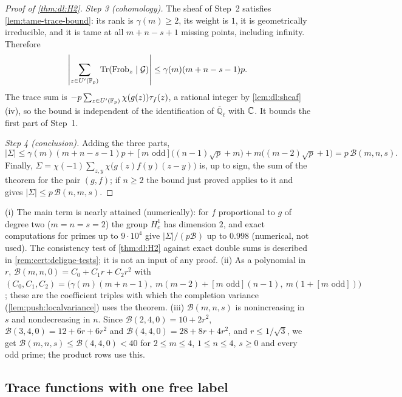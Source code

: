 \begin{proof}[Proof of \cref{thm:dl:H2}]
\emph{Step 3 (cohomology).} The sheaf of Step~2 satisfies
\cref{lem:tame-trace-bound}: its rank is $\gamma(m)\ge2$, its weight is $1$,
it is geometrically irreducible, and it is tame at all
$m+n-s+1$ missing points, including infinity. Therefore
\[
 \left|\sum_{z\in U'(\mathbb F_p)}\mathrm{Tr}(\mathrm{Frob}_z\mid\mathcal G)\right|
 \le\gamma(m)(m+n-s-1)p.
\]
The trace sum is $-p\sum_{z\in U'(\mathbb F_p)}\chi(g(z))\tau_f(z)$, a rational
integer by \cref{lem:dl:sheaf}(iv), so the bound is independent of the
identification of $\overline{\mathbb Q}_\ell$ with $\mathbb C$. It bounds the first
part of Step~1.

\emph{Step 4 (conclusion).} Adding the three parts,
\[
  |\Sigma|\le\gamma(m)(m+n-s-1)p+[m\text{ odd}]\big((n-1)\sqrt p+m\big)
  +m\big((m-2)\sqrt p+1\big)=p\,\mathcal B(m,n,s).
\]
Finally, $\Sigma=\chi(-1)\sum_{z,y}\chi\big(g(z)f(y)(z-y)\big)$ is, up to sign,
the sum of the theorem for the pair $(g,f)$; if $n\ge2$ the bound just proved
applies to it and gives $|\Sigma|\le p\,\mathcal B(n,m,s)$.
\end{proof}

\begin{remark}\label{rem:dl:H2-sharp}
(i) The main term is nearly attained (numerically): for $f$
proportional to $g$ of degree two
($m=n=s=2$) the group $H^1_c$ has dimension $2$, and exact computations for
primes up to $9\cdot10^4$ give $|\Sigma|/(p\mathcal B)$ up to $0.998$
(numerical, not used). The consistency test of \cref{thm:dl:H2} against exact
double sums is described in \cref{rem:cert:deligne-tests}; it is not an input
of any proof.
(ii) As a polynomial in $r$, $\mathcal B(m,n,0)=C_0+C_1r+C_2r^2$ with
$(C_0,C_1,C_2)=\big(\gamma(m)(m+n-1),\ m(m-2)+[m\text{ odd}](n-1),\
m(1+[m\text{ odd}])\big)$; these are the coefficient triples with which the
completion variance (\cref{lem:push:localvariance}) uses the theorem.
(iii) $\mathcal B(m,n,s)$ is nonincreasing in $s$ and nondecreasing in $n$.
Since $\mathcal B(2,4,0)=10+2r^2$, $\mathcal B(3,4,0)=12+6r+6r^2$ and
$\mathcal B(4,4,0)=28+8r+4r^2$, and $r\le1/\sqrt3$, we get
$\mathcal B(m,n,s)\le\mathcal B(4,4,0)<40$ for $2\le m\le4$, $1\le n\le4$,
$s\ge0$ and every odd prime; the product rows use this.
\end{remark}

\subsection{Trace functions with one free label}\label{subsec:moving-root}

